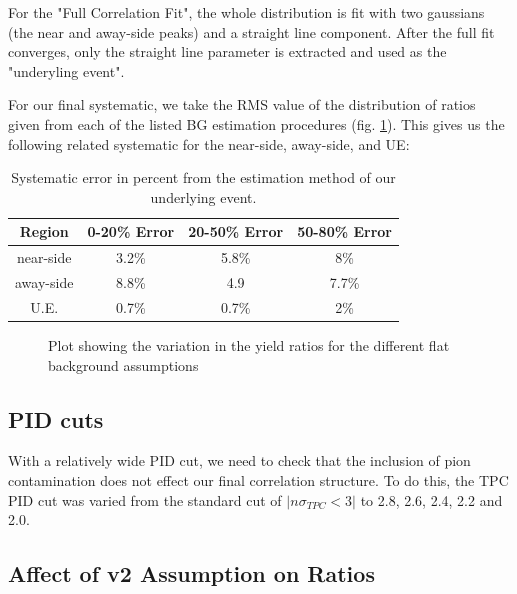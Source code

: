 \documentclass[ALICE,manyauthors]{ALICE_analysis_notes}
\begin{document}
For the "Full Correlation Fit", the whole distribution is fit with two gaussians (the near and away-side peaks) and a straight line component.  After the full fit converges, only the straight line parameter is extracted and used as the "underyling event".

For our final systematic, we take the RMS value of the distribution of ratios given from each of the listed BG estimation procedures (fig. \ref{uesyst}). This gives us the following related systematic for the near-side, away-side, and UE:

\begin{table}[h!]
    \centering
\begin{tabular}{| c | c | c | c |}
\hline
Region & 0-20\% Error & 20-50\% Error & 50-80\% Error \\
\hline
near-side & 3.2\% & 5.8\% & 8\% \\
away-side & 8.8\% & 4.9 & 7.7\% \\
U.E. & 0.7\% & 0.7\% & 2\% \\
\hline
\end{tabular}
\caption{Systematic error in percent from the estimation method of our underlying event.}
\label{evttab}
\end{table}

\begin{figure}[ht]
\centering
\begin{subfigure}{
\texttt{[image: images/nearside\_uesyst.pdf]}}
\end{subfigure}
\begin{subfigure}{
\texttt{[image: images/awayside\_uesyst.pdf]}}
\end{subfigure}
\caption{Plot showing the variation in the yield ratios for the different flat background assumptions}
\label{uesyst}
\end{figure}

\subsection{PID cuts}
\label{PIDcuts}

With a relatively wide PID cut, we need to check that the inclusion of pion contamination does not effect our final correlation structure.  To do this, the TPC PID cut was varied from the standard cut of $|n\sigma_{TPC} < 3|$ to 2.8, 2.6, 2.4, 2.2 and 2.0.

\subsection{Affect of v2 Assumption on Ratios}
\end{document}
